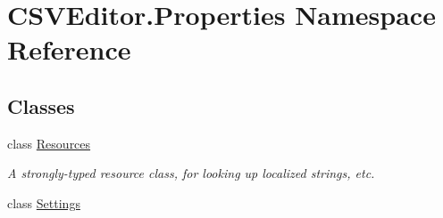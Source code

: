\hypertarget{namespace_c_s_v_editor_1_1_properties}{}\section{C\+S\+V\+Editor.\+Properties Namespace Reference}
\label{namespace_c_s_v_editor_1_1_properties}
\subsection*{Classes}
\begin{DoxyCompactItemize}
\item 
class \mbox{\hyperlink{class_c_s_v_editor_1_1_properties_1_1_resources}{Resources}}
\begin{DoxyCompactList}\small\item\em A strongly-\/typed resource class, for looking up localized strings, etc. \end{DoxyCompactList}\item 
class \mbox{\hyperlink{class_c_s_v_editor_1_1_properties_1_1_settings}{Settings}}
\end{DoxyCompactItemize}
